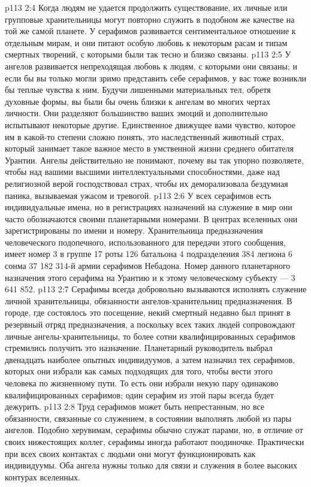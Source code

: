 \vs p113 2:4 \pc Когда людям не удается продолжить существование, их личные или групповые хранительницы могут повторно служить в подобном же качестве на той же самой планете. У серафимов развивается сентиментальное отношение к отдельным мирам, и они питают особую любовь к некоторым расам и типам смертных творений, с которыми были так тесно и близко связаны.
\vs p113 2:5 У ангелов развивается непреходящая любовь к людям, с которыми они связаны; и если бы вы только могли зримо представить себе серафимов, у вас тоже возникли бы теплые чувства к ним. Будучи лишенными материальных тел, обретя духовные формы, вы были бы очень близки к ангелам во многих чертах личности. Они разделяют большинство ваших эмоций и дополнительно испытывают некоторые другие. Единственное движущее вами чувство, которое им в какой\hyp{}то степени сложно понять, это наследственный животный страх, который занимает такое важное место в умственной жизни среднего обитателя Урантии. Ангелы действительно не понимают, почему вы так упорно позволяете, чтобы над вашими высшими интеллектуальными способностями, даже над религиозной верой господствовал страх, чтобы их деморализовала бездумная паника, вызываемая ужасом и тревогой.
\vs p113 2:6 \pc У всех серафимов есть индивидуальные имена, но в регистрациях назначений на служение в мир они часто обозначаются своими планетарными номерами. В центрах вселенных они зарегистрированы по имени и номеру. Хранительница предназначения человеческого подопечного, использованного для передачи этого сообщения, имеет номер 3 в группе 17 роты 126 батальона 4 подразделения 384 легиона 6 сонма 37 182 314\hyp{}й армии серафимов Небадона. Номер данного планетарного назначения этого серафима на Урантию и к этому человеческому субъекту --- 3 641 852.
\vs p113 2:7 \pc Серафимы всегда добровольно вызываются исполнять служение личной хранительницы, обязанности ангелов\hyp{}хранительниц предназначения. В городе, где состоялось это посещение, некий смертный недавно был принят в резервный отряд предназначения, а поскольку всех таких людей сопровождают личные ангелы\hyp{}хранительницы, то более сотни квалифицированных серафимов стремились получить это назначение. Планетарный руководитель выбрал двенадцать наиболее опытных индивидуумов, а затем назначил тех серафимов, которых они избрали как самых подходящих для того, чтобы вести этого человека по жизненному пути. То есть они избрали некую пару одинаково квалифицированных серафимов; один серафим из этой пары всегда будет дежурить.
\vs p113 2:8 Труд серафимов может быть непрестанным, но все обязанности, связанные со служением, в состоянии выполнять любой из пары ангелов. Подобно херувимам, серафимы обычно служат парами, но, в отличие от своих нижестоящих коллег, серафимы иногда работают поодиночке. Практически при всех своих контактах с людьми они могут функционировать как индивидуумы. Оба ангела нужны только для связи и служения в более высоких контурах вселенных.

